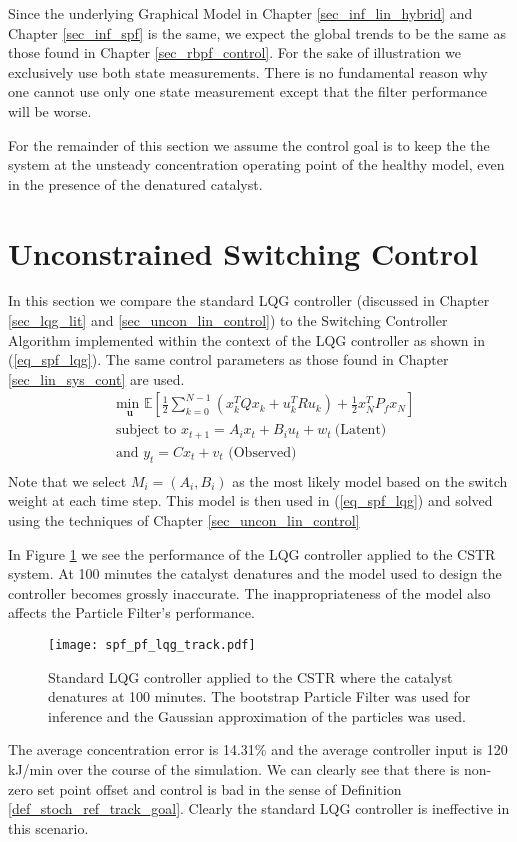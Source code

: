 Since the underlying Graphical Model in Chapter \ref{sec_inf_lin_hybrid} and Chapter \ref{sec_inf_spf} is the same, we expect the global trends to be the same as those found in Chapter \ref{sec_rbpf_control}. For the sake of illustration we exclusively use both state measurements. There is no fundamental reason why one cannot use only one state measurement except that the filter performance will be worse.

For the remainder of this section we assume the control goal is to keep the the system at the unsteady concentration operating point of the healthy model, even in the presence of the denatured catalyst.

\section{Unconstrained Switching Control}
\label{sec_spf_uncon}
In this section we compare the standard LQG controller (discussed in Chapter \ref{sec_lqg_lit} and \ref{sec_uncon_lin_control}) to the Switching Controller Algorithm implemented within the context of the LQG controller as shown in (\ref{eq_spf_lqg}). The same control parameters as those found in Chapter \ref{sec_lin_sys_cont} are used.
\begin{equation}
\begin{aligned}
&\underset{\mathbf{u}}{\text{min }} \mathbb{E}\left[ \frac{1}{2}\sum_{k=0}^{N-1} \left( x_k^TQx_k + u_k^TRu_k \right) + \frac{1}{2}x_N^TP_fx_N \right] \\
& \text{subject to } x_{t+1}=A_ix_t+B_iu_t + w_t~\text{(Latent)} \\
& \text{and } y_{t}= Cx_t + v_t \text{ (Observed)}\\
\end{aligned}
\label{eq_spf_lqg}
\end{equation}
Note that we select $M_i=(A_i, B_i)$ as the most likely model based on the switch weight at each time step. This model is then used in (\ref{eq_spf_lqg}) and solved using the techniques of Chapter \ref{sec_uncon_lin_control}
 
In Figure \ref{fig_spf_pf_lqg_track} we see the performance of the LQG controller applied to the CSTR system. At 100 minutes the catalyst denatures and the model used to design the controller becomes grossly inaccurate. The inappropriateness of the model also affects the Particle Filter's performance. 
\begin{figure}[H] 
\centering
\texttt{[image: spf\_pf\_lqg\_track.pdf]}
\caption{Standard LQG controller applied to the CSTR where the catalyst denatures at 100 minutes. The bootstrap Particle Filter was used for inference and the Gaussian approximation of the particles was used.}
\label{fig_spf_pf_lqg_track}
\end{figure}
The average concentration error is 14.31\% and the average controller input is 120 kJ/min over the course of the simulation. We can clearly see that there is non-zero set point offset and control is bad in the sense of Definition \ref{def_stoch_ref_track_goal}. Clearly the standard LQG controller is ineffective in this scenario.

